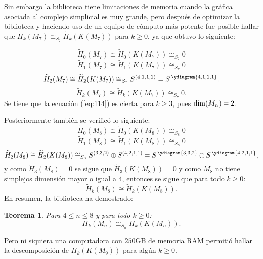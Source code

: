 \documentclass[12pt]{book}
\newtheorem{theorem}{Teorema}[section]
\theoremstyle{definition}
\newcounter{in}
\begin{document}
Sin embargo la biblioteca tiene limitaciones de memoria cuando la gráfica asociada al complejo simplicial es muy grande, pero después de optimizar la biblioteca y haciendo uso de un equipo de cómputo más potente fue posible hallar que $\widetilde H_{k}(M_{7})\cong_{S_7} \widetilde H_{k}(K(M_{7}))$ para $k\geq0$, ya que obtuvo lo siguiente:

\begin{equation}
  \widetilde H_{0}(M_{7})\cong\widetilde H_{0}(K(M_{7}))\cong_{S_{7}} 0
\end{equation}
\begin{equation}
  \widetilde H_{1}(M_{7})\cong\widetilde H_{1}(K(M_{7}))\cong_{S_{7}} 0
\end{equation}
\begin{equation}
  \widetilde H_{2}(M_{7})\cong\widetilde H_{2}(K(M_{7}))\cong_{S_{7}} S^{(4,1,1,1)} = S^{\,\ydiagram{4,1,1,1}}.
\end{equation}
\begin{equation}
\label{eq:114}
  \widetilde H_{k}(M_{7})\cong\widetilde H_{k}(K(M_{7}))\cong_{S_{7}} 0.
\end{equation}
Se tiene que la ecuación (\ref{eq:114}) es cierta para $k \geq 3$, pues $\textup{dim}(M_n) = 2$.

Posteriormente también se verificó lo siguiente:
\begin{equation}
  \widetilde H_{0}(M_{8})\cong\widetilde H_{0}(K(M_{8}))\cong_{S_{8}} 0
\end{equation}
\begin{equation}
  \widetilde H_{1}(M_{8})\cong\widetilde H_{1}(K(M_{8}))\cong_{S_{8}} 0
\end{equation}
\begin{equation}
  \widetilde H_{2}(M_{8})\cong\widetilde H_{2}(K(M_{8}))\cong_{S_{8}} S^{(3,3,2)} \oplus S^{(4,2,1,1)} = S^{\,\ydiagram{3,3,2}} \oplus S^{\,\ydiagram{4,2,1,1}},
\end{equation}
y como $\widetilde H_{3}(M_{8}) = 0$ se sigue que $\widetilde H_{3}(K(M_{8})) = 0$ y como $M_{8}$ no tiene simplejos dimensión mayor o igual a $4$, entonces se sigue que para todo $k \geq 0$:
\begin{equation}
  \widetilde H_{k}(M_{8})\cong\widetilde H_{k}(K(M_{8})).
\end{equation}
En resumen, la biblioteca ha demostrado:
\begin{theorem}
Para $4 \leq n \leq 8$ y para todo $k \geq 0$:
\begin{equation*}
H_{k}(M_{n}) \cong_{S_{n}} H_{k}(K(M_n)).
\end{equation*}
\end{theorem}
Pero ni siquiera una computadora con $250$GB de memoria RAM permitió hallar la descomposición de $H_{k}(K(M_{9}))$ para algún $k \geq 0$.
\end{document}

